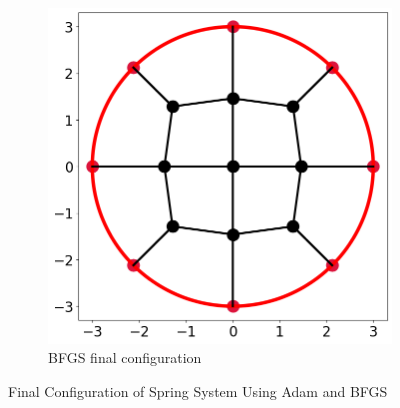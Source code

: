 \documentclass[12pt]{article}
\newcommand{\0}{\boldsymbol{0}}
\begin{document}
\begin{figure}[h!]
\begin{subfigure}[b]{0.45\textwidth}
    \end{subfigure}
    \hfill
    \begin{subfigure}[b]{0.45\textwidth}
        \centering
        \includegraphics[width=\textwidth]{../img/problem_2/bfgs.png}
        \caption{BFGS final configuration}
        \label{fig:bfgs_config}
    \end{subfigure}
    \label{fig:config}
    \caption{Final Configuration of Spring System Using Adam and BFGS}
\end{figure}
\end{document}
